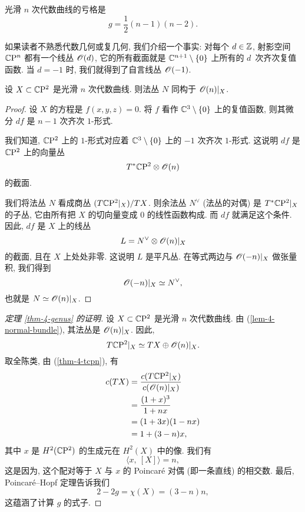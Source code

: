 \begin{theorem} \label{thm-4-genus}
    光滑 $n$ 次代数曲线的亏格是
    \[ g = \frac12 (n-1) (n-2). \]
\end{theorem}

如果读者不熟悉代数几何或复几何, 我们介绍一个事实:
对每个 $d \in \mathbb{Z}$, 射影空间 $\mathbb{C} \mathrm{P}^n$ 都有一个线丛 $\mathscr{O} (d)$,
它的所有截面就是 $\mathbb{C}^{n+1} \setminus \{0\}$ 上所有的 $d$~次齐次复值函数.
当 $d = -1$ 时, 我们就得到了自言线丛 $\mathscr{O} (-1)$.

\begin{lemma} \label{lem-4-normal-bundle}
    设 $X \subset \mathbb{C} \mathrm{P}^2$ 是光滑 $n$ 次代数曲线.
    则法丛 $N$ 同构于 $\mathscr{O} (n) |_X$.
\end{lemma}

\begin{proof}
    设 $X$ 的方程是 $f (x, y, z) = 0$.
    将 $f$ 看作 $\mathbb{C}^3 \setminus \{0\}$ 上的复值函数,
    则其微分 $df$ 是 $n-1$ 次齐次 $1$-形式.

    我们知道, $\mathbb{C} \mathrm{P}^2$ 上的 $1$-形式对应着
    $\mathbb{C}^3 \setminus \{0\}$ 上的 $-1$ 次齐次 $1$-形式.
    这说明 $df$ 是 $\mathbb{C} \mathrm{P}^2$ 上的向量丛
    \[ T^* \mathbb{C} \mathrm{P}^2 \otimes \mathscr{O} (n) \]
    的截面.

    我们将法丛 $N$ 看成商丛 $(T \mathbb{C} \mathrm{P}^2 |_X) / TX$.
    则余法丛 $N^{\vee}$ (法丛的对偶) 是 $T^* \mathbb{C} \mathrm{P}^2 |_X$ 的子丛,
    它由所有把 $X$ 的切向量变成 $0$ 的线性函数构成.
    而 $df$ 就满足这个条件. 因此, $df$ 是 $X$ 上的线丛
    \[ L = N^\vee \otimes \mathscr{O} (n) |_X \]
    的截面, 且在 $X$ 上处处非零.
    这说明 $L$ 是平凡丛. 在等式两边与 $\mathscr{O} (-n) |_X$ 做张量积, 我们得到
    \[ \mathscr{O} (-n) |_X \simeq N^\vee, \]
    也就是 $N \simeq \mathscr{O} (n) |_X$.
\end{proof}

\begin{proof} [定理 \ref{thm-4-genus} 的证明]
    \allowdisplaybreaks
    设 $X \subset \mathbb{C} \mathrm{P}^2$ 是光滑 $n$ 次代数曲线. 
    由 (\ref{lem-4-normal-bundle}), 其法丛是 $\mathscr{O} (n) |_X$. 因此,
    \[ T \mathbb{C} \mathrm{P}^2 |_X \simeq TX \oplus \mathscr{O} (n) |_X. \]
    取全陈类, 由 (\ref{thm-4-tcpn}), 有
    \begin{align*}
        c (TX) &= \frac {c (T \mathbb{C} \mathrm{P}^2 |_X)} {c (\mathscr{O} (n) |_X)} \\
        &= \frac {(1 + x)^3} {1 + nx} \\
        &= (1 + 3x) (1 - nx) \\
        &= 1 + (3 - n) x,
    \end{align*}
    其中 $x$ 是 $H^2 (\mathbb{C} \mathrm{P}^2)$ 的生成元在 $H^2 (X)$ 中的像.
    我们有
    \[ \langle x,\ [X] \rangle = n, \]
    这是因为, 这个配对等于 $X$ 与 $x$ 的 Poincaré 对偶 (即一条直线) 的相交数.
    最后, Poincaré--Hopf 定理告诉我们
    \[ 2 - 2g = \chi (X) = (3 - n) n, \]
    这蕴涵了计算 $g$ 的式子.
\end{proof}


